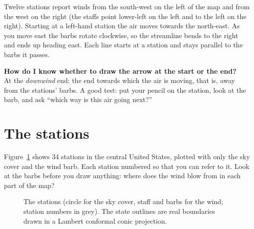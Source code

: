 \begin{workedbox}
Twelve stations report winds from the south-west on the left of the map and from the west on the right (the staffs point lower-left on the left and to the left on the right). Starting at a left-hand station the air moves towards the north-east. As you move east the barbs rotate clockwise, so the streamline bends to the right and ends up heading east. Each line starts at a station and stays parallel to the barbs it passes.
\begin{center}
\begin{tikzpicture}[x=0.1cm,y=-0.1cm,line cap=round]
  
\end{tikzpicture}
\end{center}
\end{workedbox}

\begin{askbox}
\textbf{How do I know whether to draw the arrow at the start or the end?}\\
At the \emph{downwind} end: the end towards which the air is moving, that is, away from the stations' barbs. A good test: put your pencil on the station, look at the barb, and ask ``which way is this air going next?''
\end{askbox}

\section{The stations}

Figure~\ref{p3-fig:fig8} shows 34 stations in the central United States, plotted with only the sky cover and the wind barb. Each station numbered so that you can refer to it. Look at the barbs before you draw anything: where does the wind blow from in each part of the map?

\begin{figure}[ht]
\centering
\mapbase{0.0196cm}{}
\caption{The stations (circle for the sky cover, staff and barbs for the wind; station numbers in grey). The state outlines are real boundaries drawn in a Lambert conformal conic projection.}\label{p3-fig:fig8}
\end{figure}

